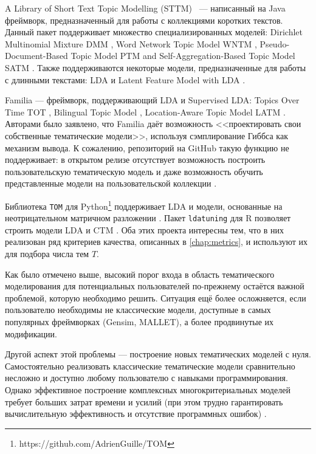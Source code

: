 A Library of Short Text Topic Modelling (STTM) \cite{qiang2018sttm} ~--- написанный на Java фреймворк, предназначенный для работы с коллекциями коротких текстов. Данный пакет поддерживает множество специализированных моделей: Dirichlet Multinomial Mixture DMM \cite{yin2014dirichlet}, Word Network Topic Model WNTM \cite{zuo2016word}, Pseudo-Document-Based Topic Model PTM \cite{zuo2016topic} and Self-Aggregation-Based Topic Model SATM \cite{quan2015short}. Также поддерживаются некоторые модели, предназначенные для работы с длинными текстами: LDA и Latent Feature Model with LDA \cite{nguyen2015improving}.  

Familia \cite{jiang2018familia} --- фреймворк, поддерживающий LDA и Supervised LDA: Topics Over Time TOT \cite{wang2006topics}, Bilingual Topic Model \cite{gao2011clickthrough}, Location-Aware Topic Model LATM \cite{wang2007mining}. Авторами было заявлено, что Familia даёт возможность <<проектировать свои собственные тематические модели>>, используя сэмплирование Гиббса как механизм вывода. К сожалению, репозиторий на GitHub такую функцию не поддерживает: в открытом релизе отсутствует возможность построить пользовательскую тематическую модель и даже возможность обучить представленные модели на пользовательской коллекции \cite{familia_github}.  

Библиотека \texttt{TOM} для Python\footnote{ https://github.com/AdrienGuille/TOM} поддерживает LDA и модели, основанные на неотрицательном матричном разложении \cite{guille2016tom}. Пакет \texttt{ldatuning} для R позволяет строить модели LDA и CTM \cite{ldatuning}. Оба этих проекта интересны тем, что в них реализован ряд критериев качества, описанных в \ref{chap:metrics}, и используют их для подбора числа тем $T$.  

Как было отмечено выше, высокий порог входа в область тематического моделирования для потенциальных пользователей по-прежнему остаётся важной проблемой, которую необходимо решить. Ситуация ещё более осложняется, если пользователю необходимы не классические модели, доступные в самых популярных фреймворках (Gensim, MALLET), а более продвинутые их модификации.  

Другой аспект этой проблемы --- построение новых тематических моделей с нуля. Самостоятельно реализовать классические тематические модели сравнительно несложно и доступно любому пользователю с навыками программирования. Однако эффективное построение комплексных многокритериальных моделей требует больших затрат времени и усилий (при этом трудно гарантировать вычислительную эффективность и отсутствие программных ошибок) \cite{jiang2018familia}.  


